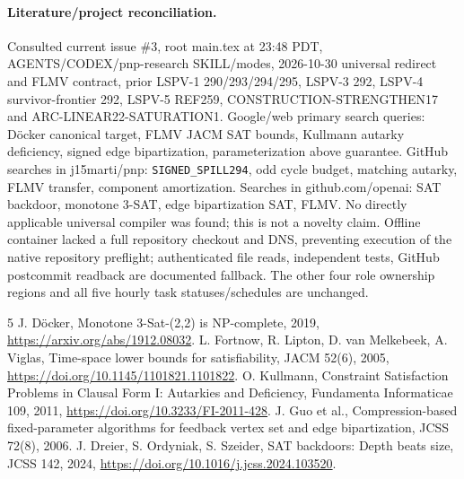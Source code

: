 \documentclass[11pt]{article}
\begin{document}
\paragraph{Literature/project reconciliation.}
Consulted current issue \#3, root main.tex at 23:48 PDT, AGENTS/CODEX/pnp-research SKILL/modes, 2026-10-30 universal redirect and FLMV contract, prior LSPV-1 290/293/294/295, LSPV-3 292, LSPV-4 survivor-frontier 292, LSPV-5 REF259, CONSTRUCTION-STRENGTHEN17 and ARC-LINEAR22-SATURATION1. Google/web primary search queries: D\"ocker canonical target, FLMV JACM SAT bounds, Kullmann autarky deficiency, signed edge bipartization, parameterization above guarantee. GitHub searches in j15marti/pnp: \texttt{SIGNED\_SPILL294}, odd cycle budget, matching autarky, FLMV transfer, component amortization. Searches in github.com/openai: SAT backdoor, monotone 3-SAT, edge bipartization SAT, FLMV. No directly applicable universal compiler was found; this is not a novelty claim. Offline container lacked a full repository checkout and DNS, preventing execution of the native repository preflight; authenticated file reads, independent tests, GitHub postcommit readback are documented fallback. The other four role ownership regions and all five hourly task statuses/schedules are unchanged.
\begin{thebibliography}{5}
 J. D\"ocker, Monotone 3-Sat-(2,2) is NP-complete, 2019, \url{https://arxiv.org/abs/1912.08032}.
 L. Fortnow, R. Lipton, D. van Melkebeek, A. Viglas, Time-space lower bounds for satisfiability, JACM 52(6), 2005, \url{https://doi.org/10.1145/1101821.1101822}.
 O. Kullmann, Constraint Satisfaction Problems in Clausal Form I: Autarkies and Deficiency, Fundamenta Informaticae 109, 2011, \url{https://doi.org/10.3233/FI-2011-428}.
 J. Guo et al., Compression-based fixed-parameter algorithms for feedback vertex set and edge bipartization, JCSS 72(8), 2006.
 J. Dreier, S. Ordyniak, S. Szeider, SAT backdoors: Depth beats size, JCSS 142, 2024, \url{https://doi.org/10.1016/j.jcss.2024.103520}.
\end{thebibliography}
\end{document}
